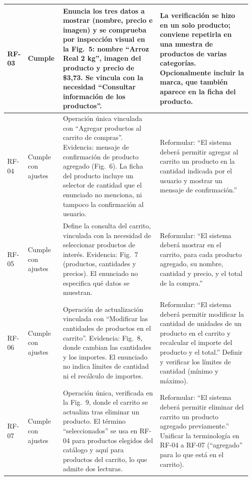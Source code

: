 \documentclass[11pt,a4paper]{article}
\begin{document}
\begin{longtable}{|L{0.075\textwidth}|L{0.11\textwidth}|L{0.40\textwidth}|L{0.31\textwidth}|}
RF-03 & Cumple &
Enuncia los tres datos a mostrar (nombre, precio e imagen) y se
comprueba por inspección visual en la Fig.~5: nombre
``Arroz Real 2 kg'', imagen del producto y precio de \$3,73.
Se vincula con la necesidad ``Consultar información de los
productos''. &
La verificación se hizo en un solo producto; conviene repetirla
en una muestra de productos de varias categorías. Opcionalmente
incluir la marca, que también aparece en la ficha del producto. \\
\hline

RF-04 & Cumple con ajustes &
Operación única vinculada con ``Agregar productos al carrito de
compras''. Evidencia: mensaje de confirmación de producto agregado
(Fig.~6). La ficha del producto incluye un selector de
cantidad que el enunciado no menciona, ni tampoco la confirmación
al usuario. &
Reformular: ``El sistema deberá permitir agregar al carrito un
producto en la cantidad indicada por el usuario y mostrar un
mensaje de confirmación.'' \\
\hline

RF-05 & Cumple con ajustes &
Define la consulta del carrito, vinculada con la necesidad de
seleccionar productos de interés. Evidencia: Fig.~7
(productos, cantidades y precios). El enunciado no especifica qué
datos se muestran. &
Reformular: ``El sistema deberá mostrar en el carrito, para cada
producto agregado, su nombre, cantidad y precio, y el total de la
compra.'' \\
\hline

RF-06 & Cumple con ajustes &
Operación de actualización vinculada con ``Modificar las
cantidades de productos en el carrito''. Evidencia:
Fig.~8, donde cambian las cantidades y los importes.
El enunciado no indica límites de cantidad ni el recálculo de
importes. &
Reformular: ``El sistema deberá permitir modificar la cantidad
de unidades de un producto en el carrito y recalcular el importe
del producto y el total.'' Definir y verificar los límites de
cantidad (mínimo y máximo). \\
\hline

RF-07 & Cumple con ajustes &
Operación única, verificada en la Fig.~9, donde el
carrito se actualiza tras eliminar un producto. El término
``seleccionados'' se usa en RF-04 para productos elegidos del
catálogo y aquí para productos del carrito, lo que admite dos
lecturas. &
Reformular: ``El sistema deberá permitir eliminar del carrito un
producto agregado previamente.'' Unificar la terminología en
RF-04 a RF-07 (``agregado'' para lo que está en el carrito). \\
\hline


\end{longtable}
\end{document}
